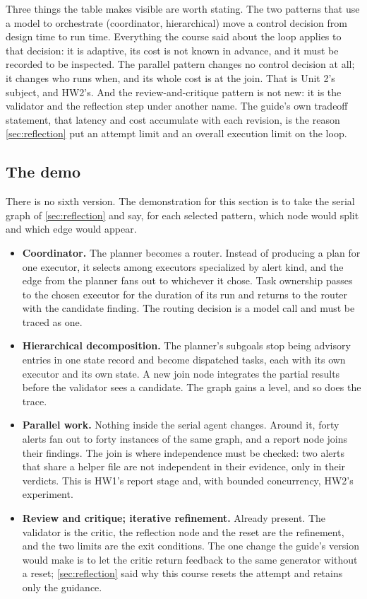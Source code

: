 Three things the table makes visible are worth stating. The two patterns that use a model
to orchestrate (coordinator, hierarchical) move a control decision from design time to run
time. Everything the course said about the loop applies to that decision: it is adaptive, its
cost is not known in advance, and it must be recorded to be inspected. The parallel
pattern changes no control decision at all; it changes who runs when, and its whole cost
is at the join. That is Unit 2's subject, and HW2's. And the review-and-critique pattern is
not new: it is the validator and the reflection step under another name. The guide's own tradeoff
statement, that latency and cost accumulate with each revision, is the reason
\cref{sec:reflection} put an attempt limit and an overall execution limit on the loop.

\subsection{The demo}

There is no sixth version. The demonstration for this section is to take the serial graph
of \cref{sec:reflection} and say, for each selected pattern, which node would split and
which edge would appear.

\begin{itemize}
  \item \textbf{Coordinator.} The planner becomes a router. Instead of producing a plan
  for one executor, it selects among executors specialized by alert kind, and the edge from
  the planner fans out to whichever it chose. Task ownership passes to the chosen executor
  for the duration of its run and returns to the router with the candidate finding. The
  routing decision is a model call and must be traced as one.
  \item \textbf{Hierarchical decomposition.} The planner's subgoals stop being advisory
  entries in one state record and become dispatched tasks, each with its own executor and
  its own state. A new join node integrates the partial results before the validator sees a
  candidate. The graph gains a level, and so does the trace.
  \item \textbf{Parallel work.} Nothing inside the serial agent changes. Around it, forty
  alerts fan out to forty instances of the same graph, and a report node joins their
  findings. The join is where independence must be checked: two alerts that share a helper
  file are not independent in their evidence, only in their verdicts. This is HW1's report
  stage and, with bounded concurrency, HW2's experiment.
  \item \textbf{Review and critique; iterative refinement.} Already present. The validator
  is the critic, the reflection node and the reset are the refinement, and the two limits
  are the exit conditions. The one change the guide's version would make is to let the
  critic return feedback to the same generator without a reset; \cref{sec:reflection} said
  why this course resets the attempt and retains only the guidance.
\end{itemize}

